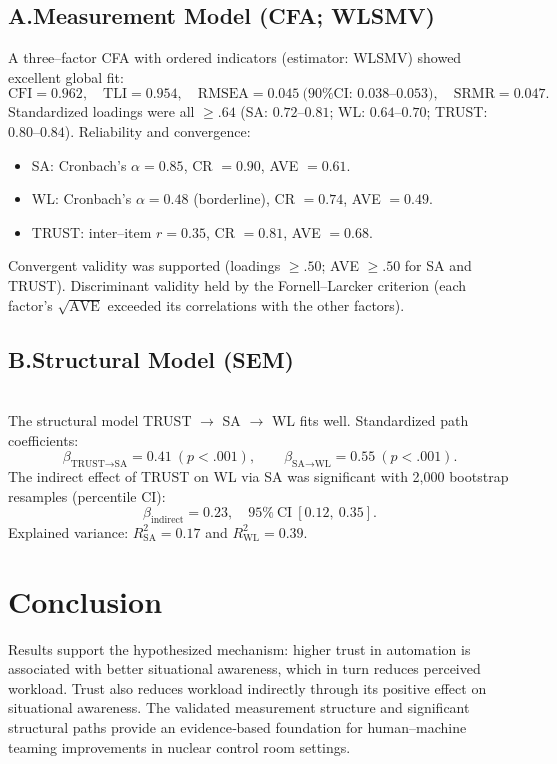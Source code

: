 \documentclass[conference]{IEEEtran}
\begin{document}
\subsection{A.{Measurement Model (CFA; WLSMV)}}
A three–factor CFA with ordered indicators (estimator: WLSMV) showed excellent global fit:
\[
\text{CFI}=0.962,\quad \text{TLI}=0.954,\quad
\text{RMSEA}=0.045\ \text{(90\% CI: 0.038--0.053)},
\quad
\text{SRMR}=0.047 .
\]
Standardized loadings were all $\ge .64$ (SA: $0.72$–$0.81$; WL: $0.64$–$0.70$; TRUST: $0.80$–$0.84$). Reliability and convergence:
\begin{itemize}
  \item SA: Cronbach’s $\alpha=0.85$, CR $=0.90$, AVE $=0.61$.
  \item WL: Cronbach’s $\alpha=0.48$ (borderline), CR $=0.74$, AVE $=0.49$.
  \item TRUST: inter–item $r=0.35$, CR $=0.81$, AVE $=0.68$.
\end{itemize}
Convergent validity was supported (loadings $\ge .50$; AVE $\ge .50$ for SA and TRUST). Discriminant validity held by the Fornell–Larcker criterion (each factor’s $\sqrt{\text{AVE}}$ exceeded its correlations with the other factors).







\subsection{B.{Structural Model (SEM)}}\\


The structural model TRUST $\rightarrow$ SA $\rightarrow$ WL fits well. Standardized path coefficients: 
\[
\beta_{\text{TRUST}\to\text{SA}}=0.41\ (p<.001),\qquad
\beta_{\text{SA}\to\text{WL}}=0.55\ (p<.001).
\]
The indirect effect of TRUST on WL via SA was significant with 2{,}000 bootstrap resamples (percentile CI):
\[
\beta_{\text{indirect}}=0.23,\quad 95\%\ \text{CI}\ [0.12,\ 0.35].
\]
Explained variance: $R^2_{\text{SA}}=0.17$ and $R^2_{\text{WL}}=0.39$.

\section{Conclusion}
Results support the hypothesized mechanism: higher trust in automation is associated with better situational awareness, which in turn reduces perceived workload. Trust also reduces workload indirectly through its positive effect on situational awareness. The validated measurement structure and significant structural paths provide an evidence‐based foundation for human–machine teaming improvements in nuclear control room settings.
\end{document}
